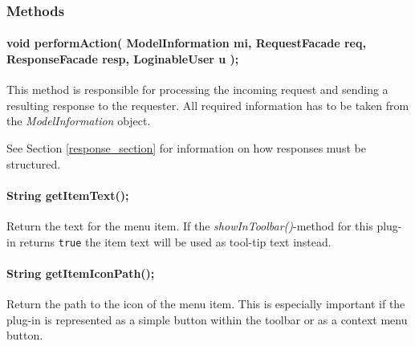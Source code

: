 		\subsubsection{Methods}
			\paragraph{void performAction( ModelInformation mi,
RequestFacade req, ResponseFacade resp, LoginableUser u );}
			This method is responsible for processing the incoming
request and sending a resulting response to the requester.
			All required information has to be taken from the
\textit{ModelInformation} object. 
			
			See Section \ref{response_section} for information on
how responses must be structured.
			
			\paragraph{String getItemText();}
			Return the text for the menu item. If the
\textit{showInToolbar()}-method for this plug-in returns \verb!true! the item
text will be used as tool-tip text instead.

			\paragraph{String getItemIconPath();}
			Return the path to the icon of the menu item. This is
especially important if the plug-in is represented as a simple button within the
toolbar or as a context menu button.
			
			